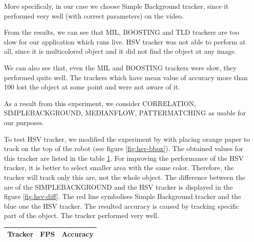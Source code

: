 More specificaly, in our case we choose Simple Background tracker, since it
performed very well (with correct parameters) on the video.

From the results, we can see that MIL, BOOSTING and TLD trackers are too slow
for our application which runs live. HSV tracker was not able to perform at
all, since it is multicolored object and it did not find the object at any
image.

We can also see that, even the MIL and BOOSTING trackers were slow, they
performed quite well. The trackers which have mean value of accuracy more than
100 lost the object at some point and were not aware of it.

As a result from this experiment, we consider CORRELATION, SIMPLEBACKGROUND,
MEDIANFLOW, PATTERMATCHING as usable for our purposes.

To test HSV tracker, we modified the experiment by with placing orange
paper to track on the top of the robot (see figure \ref{fig:hsv-bbox}). The obtained
values for this tracker are listed in the table \ref{table:hsv}. For improving the
performance of the HSV tracker, it is better to select smaller area with the
same color. Therefore, the tracker will track only this are, not the whole
object. The difference between the are of the SIMPLEBACKGROUND and the HSV
tracker is displayed in the figure \ref{fig:hsv-diff}. The red line symbolises
Simple Background tracker and the blue one the HSV tracker. The resulted
accuracy is caused by tracking specific part of the object. The tracker
performed very well.

\begin{table}
\centering
\begin{tabular}{l|l|l}
Tracker	& FPS & Accuracy \\
\hline

\end{tabular}
\label{table:hsv}
\end{table}

